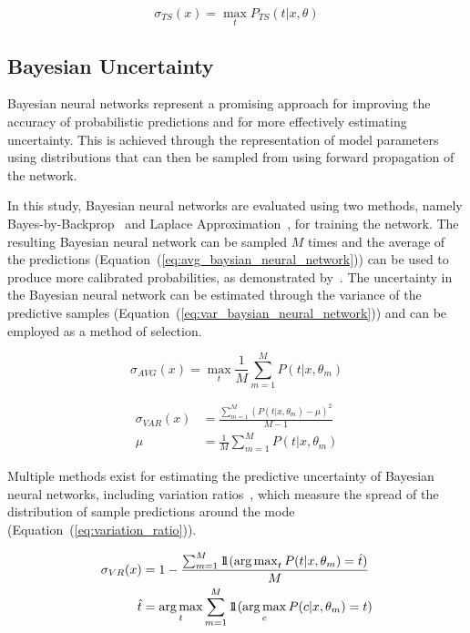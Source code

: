 \begin{equation}
	\sigma_{TS}(x) = \max_tP_{TS}(t|x,\theta)
	\label{eq:selective_temperature_scaling}
\end{equation}

\subsection{Bayesian Uncertainty}
\label{subsec:selective_uncertainity}
Bayesian neural networks represent a promising approach for improving the accuracy of probabilistic predictions and for more effectively estimating uncertainty. This is achieved through the representation of model parameters using distributions that can then be sampled from using forward propagation of the network.

In this study, Bayesian neural networks are evaluated using two methods, namely Bayes-by-Backprop~\citep{blundell2015weight} and Laplace Approximation~\citep{mackay1992bayesian}, for training the network. The resulting Bayesian neural network can be sampled $M$ times and the average of the predictions (Equation~(\ref{eq:avg_baysian_neural_network})) can be used to produce more calibrated probabilities, as demonstrated by~\citep{jospin2022hands}. The uncertainty in the Bayesian neural network can be estimated through the variance of the predictive samples (Equation~(\ref{eq:var_baysian_neural_network})) and can be employed as a method of selection.

\begin{equation}
	\sigma_{AVG}(x)=\max_t\frac{1}{M}\sum^M_{m=1}P(t|x,\theta_m)
	\label{eq:avg_baysian_neural_network}
\end{equation}

\begin{equation}
	\begin{aligned}
		\sigma_{VAR}(x)&=\frac{\sum^M_{m=1}(P(t|x,\theta_m)-\mu)^2}{M-1}\\
		\mu&=\frac{1}{M}\sum^M_{m=1}P(t|x,\theta_m)
	\end{aligned}
	\label{eq:var_baysian_neural_network}
\end{equation}

Multiple methods exist for estimating the predictive uncertainty of Bayesian neural networks, including variation ratios~\citep{freeman1965elementary}, which measure the spread of the distribution of sample predictions around the mode (Equation~(\ref{eq:variation_ratio})).

\begin{equation}
	\begin{aligned}
		\sigma_{VR}(x) &= 1 - \frac{\sum^M_{m=1}1\!\!1(\operatorname*{arg\,max}_tP(t|x,\theta_m)=\hat{t})}{M}\\
		\qquad\hat{t} &= \operatorname*{arg\,max}_t\sum^M_{m=1}1\!\!1(\operatorname*{arg\,max}_cP(c|x,\theta_m)=t)
	\end{aligned}
	\label{eq:variation_ratio}
\end{equation}


